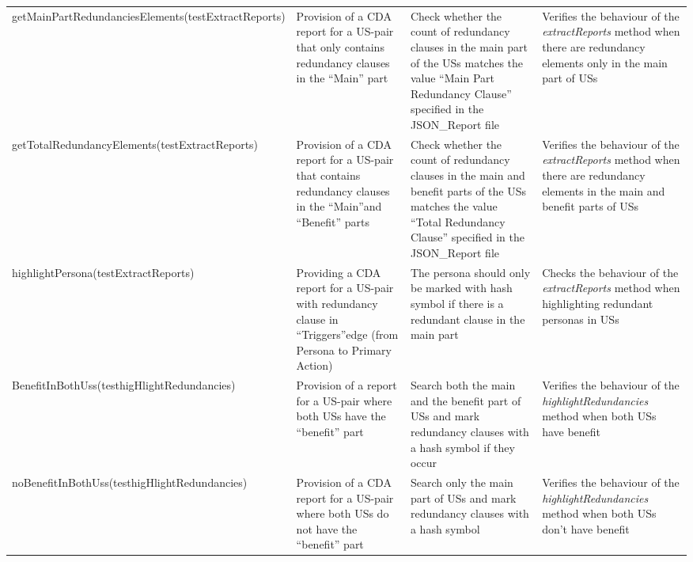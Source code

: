 \begin{tabularx}{\textwidth}{X  X  X  X}
			getMainPartRedundancies\newline Elements\newline(testExtractReports)&Provision of a CDA report for a US-pair that only contains redundancy clauses in the \enquote{Main} part&Check whether the count of redundancy clauses in the main part of the USs matches the value \enquote{Main Part Redundancy Clause} specified in the JSON\_Report file&Verifies the behaviour of the \textit{extractReports} method when there are redundancy elements only in the main part of USs\\
			
			getTotalRedundancy\newline Elements\newline(testExtractReports)&Provision of a CDA report for a US-pair that contains redundancy clauses in the \enquote{Main}and \enquote{Benefit} parts&Check whether the count of redundancy clauses in the main and benefit parts of the USs matches the value \enquote{Total Redundancy Clause} specified in the JSON\_Report file&Verifies the behaviour of the \textit{extractReports} method when there are redundancy elements in the main and benefit parts of USs\\
			
			highlightPersona\newline(testExtractReports)&Providing a CDA report for a US-pair with redundancy clause in \enquote{Triggers}edge (from Persona to Primary Action)&The persona should only be marked with hash symbol if there is a redundant clause in the main part&Checks the behaviour of the \textit{extractReports} method when highlighting redundant personas in USs\\
				
			BenefitInBothUss\newline(testhigHlightRedundancies)&Provision of a report for a US-pair where both USs have the \enquote{benefit} part&Search both the main and the benefit part of USs and mark redundancy clauses with a hash symbol if they occur&Verifies the behaviour of the \textit{highlightRedundancies} method when both USs have benefit\\
			
			noBenefitInBothUss\newline(testhigHlightRedundancies)&Provision of a CDA report for a US-pair where both USs do not have the \enquote{benefit} part&Search only the main part of USs and mark redundancy clauses with a hash symbol&Verifies the behaviour of the \textit{highlightRedundancies} method when both USs don't have benefit\\
			

\end{tabularx}
